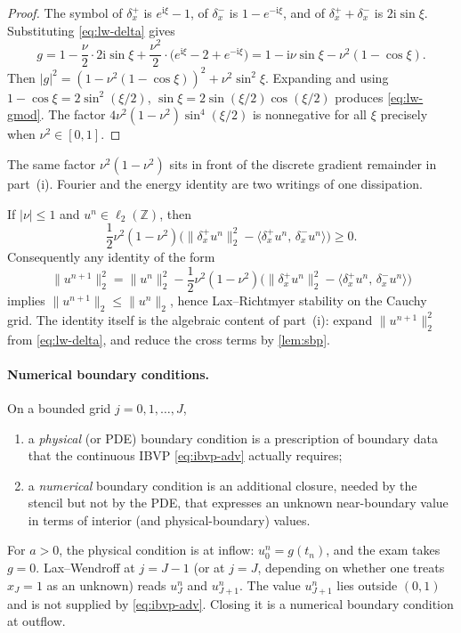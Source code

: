\begin{proof}
The symbol of \(\delta_x^+\) is \(e^{\mathrm{i}\xi}-1\), of \(\delta_x^-\) is \(1-e^{-\mathrm{i}\xi}\), and of \(\delta_x^++\delta_x^-\) is \(2\mathrm{i}\sin\xi\). Substituting \eqref{eq:lw-delta} gives
\[
g
=
1
-
\frac{\nu}{2}\cdot 2\mathrm{i}\sin\xi
+
\frac{\nu^2}{2}\cdot\bigl(e^{\mathrm{i}\xi}-2+e^{-\mathrm{i}\xi}\bigr)
=
1-\mathrm{i}\nu\sin\xi-\nu^2(1-\cos\xi).
\]
Then \(\lvert g\rvert^2=(1-\nu^2(1-\cos\xi))^2+\nu^2\sin^2\xi\). Expanding and using \(1-\cos\xi=2\sin^2(\xi/2)\), \(\sin\xi=2\sin(\xi/2)\cos(\xi/2)\) produces \eqref{eq:lw-gmod}. The factor \(4\nu^2(1-\nu^2)\sin^4(\xi/2)\) is nonnegative for all \(\xi\) precisely when \(\nu^2\in[0,1]\).
\end{proof}

The same factor \(\nu^2(1-\nu^2)\) sits in front of the discrete gradient remainder in part~(i). Fourier and the energy identity are two writings of one dissipation.

\begin{proposition}
\label{prop:lw-energy-sign}
If \(\lvert\nu\rvert\le 1\) and \(u^n\in\ell_2(\mathbb{Z})\), then
\[
\frac12\nu^2(1-\nu^2)
\bigl(
\|\delta_x^+ u^n\|_2^2
-
\langle \delta_x^+ u^n,\,\delta_x^- u^n\rangle
\bigr)
\ge
0.
\]
Consequently any identity of the form
\[
\|u^{n+1}\|_2^2
=
\|u^n\|_2^2
-
\frac12\nu^2(1-\nu^2)
\bigl(
\|\delta_x^+ u^n\|_2^2
-
\langle \delta_x^+ u^n,\,\delta_x^- u^n\rangle
\bigr)
\]
implies \(\|u^{n+1}\|_2\le\|u^n\|_2\), hence Lax--Richtmyer stability on the Cauchy grid. The identity itself is the algebraic content of part~(i): expand \(\|u^{n+1}\|_2^2\) from \eqref{eq:lw-delta}, and reduce the cross terms by \cref{lem:sbp}.
\end{proposition}

\paragraph{Numerical boundary conditions.}

\begin{definition}
\label{def:nbc}
On a bounded grid \(j=0,1,\dots,J\),
\begin{enumerate}[label=\textup{(\roman*)}]
    \item a \emph{physical} (or PDE) boundary condition is a prescription of boundary data that the continuous IBVP \eqref{eq:ibvp-adv} actually requires;
    \item a \emph{numerical} boundary condition is an additional closure, needed by the stencil but not by the PDE, that expresses an unknown near-boundary value in terms of interior (and physical-boundary) values.
\end{enumerate}
For \(a>0\), the physical condition is at inflow: \(u_0^n=g(t_n)\), and the exam takes \(g=0\). Lax--Wendroff at \(j=J-1\) (or at \(j=J\), depending on whether one treats \(x_J=1\) as an unknown) reads \(u_J^n\) and \(u_{J+1}^n\). The value \(u_{J+1}^n\) lies outside \((0,1)\) and is not supplied by \eqref{eq:ibvp-adv}. Closing it is a numerical boundary condition at outflow.
\end{definition}

